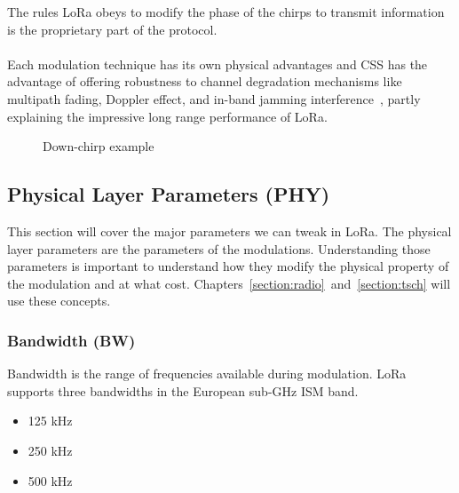 The rules LoRa obeys to modify the phase of the chirps to transmit information
is the proprietary part of the protocol.

\paragraph{}

Each modulation technique has its own physical advantages and
CSS has the advantage of offering robustness to channel degradation
mechanisms like multipath fading, Doppler effect, and in-band jamming
interference~\cite{semtech:modulationbasics}, partly explaining the impressive long
range performance of LoRa.

\begin{figure}[H]
\centering
{}
\caption{Down-chirp example\label{fig:downchirp}}
\end{figure}

\subsection{Physical Layer Parameters (PHY)}

This section will cover the major parameters we can tweak in LoRa.
The physical layer parameters are the parameters of the modulations.
Understanding those parameters is important to understand how they modify
the physical property of the modulation and at what cost.
Chapters~\ref{section:radio}~and~\ref{section:tsch} will use these concepts.

\subsubsection{Bandwidth (BW)\label{section:bw}}

Bandwidth is the range of frequencies available during modulation.
LoRa supports three bandwidths in the European sub-GHz ISM band.

\begin{itemize}
    \item 125 kHz
    \item 250 kHz
    \item 500 kHz
\end{itemize}

